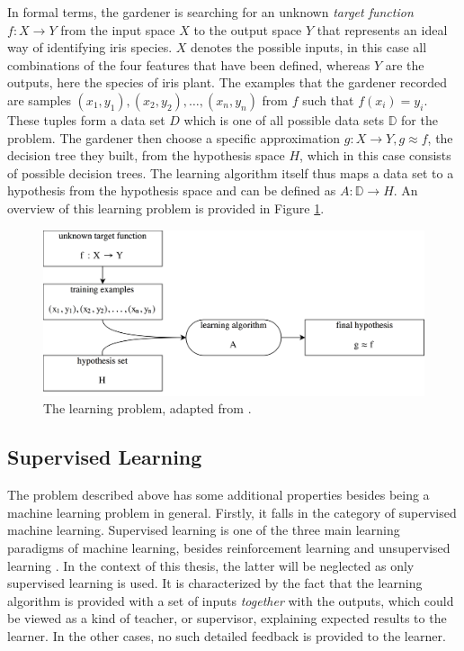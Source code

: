 In formal terms, the gardener is searching for an unknown \textit{target function} $f:X \rightarrow Y$ from the input space $X$ to the output space $Y$ \cite{abu2012learning} that represents an ideal way of identifying iris species. $X$ denotes the possible inputs, in this case all combinations of the four features that have been defined, whereas $Y$ are the outputs, here the species of iris plant. The examples that the gardener recorded are samples $(x_1,y_1),(x_2,y_2),\dots,(x_n,y_n)$ from $f$ such that $f(x_i)=y_i$. These tuples form a data set $D$ which is one of all possible data sets $\mathbb{D}$ for the problem. The gardener then choose a specific approximation $g:X \rightarrow Y,g\approx f$, the decision tree they built, from the hypothesis space $H$, which in this case consists of possible decision trees. The learning algorithm itself thus maps a data set to a hypothesis from the hypothesis space and can be defined as $A:\mathbb{D}\rightarrow H$. An overview of this learning problem is provided in Figure \ref{fig:learning_problem}.

\begin{figure}
\centering
\includegraphics[width=\textwidth]{gfx/machine_learning.png}
\caption{The learning problem, adapted from \cite{abu2012learning}.}
\label{fig:learning_problem}
\end{figure}

\subsection{Supervised Learning}
The problem described above has some additional properties besides being a machine learning problem in general. Firstly, it falls in the category of supervised machine learning. Supervised learning is one of the three main learning paradigms of machine learning, besides reinforcement learning and unsupervised learning \cite{abu2012learning}. In the context of this thesis, the latter will be neglected as only supervised learning is used. It is characterized by the fact that the learning algorithm is provided with a set of inputs \textit{together} with the outputs, which could be viewed as a kind of teacher, or supervisor, explaining expected results to the learner. In the other cases, no such detailed feedback is provided to the learner. 

